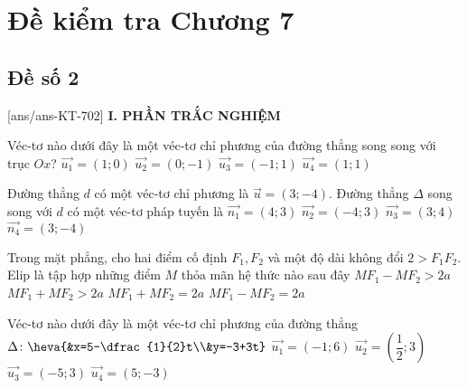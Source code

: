 \section*{Đề kiểm tra Chương 7}
\subsection*{Đề số 2}
\setcounter{ex}{0}\setcounter{bt}{0}
[ans/ans-KT-702]
\noindent\textbf{I. PHẦN TRẮC NGHIỆM}
	\begin{ex}%
	Véc-tơ nào dưới đây là một véc-tơ chỉ phương của đường thẳng song song với trục $Ox$?
	\choice
	{\True $\overrightarrow{u_{1}}=(1;0)$}
	{$\overrightarrow{u_{2}}=(0;-1)$}
	{$\overrightarrow{u_{3}}=(-1;1)$}
	{$\overrightarrow{u_{4}}=(1;1)$}
\end{ex}
	\begin{ex}%
	Đường thẳng $d$ có một véc-tơ chỉ phương là $\overrightarrow{u}=(3;-4)$. Đường thẳng $\Delta$ song song với $d$ có một véc-tơ pháp tuyến là
	\choice
	{\True $\overrightarrow{n_{1}}=(4;3)$}
	{$\overrightarrow{n_{2}}=(-4;3)$}
	{$\overrightarrow{n_{3}}=(3;4)$}
	{$\overrightarrow{n_{4}}=(3;-4)$}
\end{ex}	
	\begin{ex}%
		Trong mặt phẳng, cho hai điểm cố định $F_1, F_2$ và một độ dài không đổi $2>F_1F_2$. Elip là tập hợp những điểm $M$ thỏa mãn hệ thức nào sau đây
		\choice
		{$MF_1-MF_2>2a$}
		{$MF_1+MF_2>2a$}
		{\True $MF_1+MF_2=2a$}
		{$MF_1-MF_2=2a$}
	\end{ex}
\begin{ex}%
	Véc-tơ nào dưới đây là một véc-tơ chỉ phương của đường thẳng $\Delta \colon \heva{&x=5-\dfrac{1}{2}t\\&y=-3+3t}$
	\choice
	{\True $\overrightarrow{u_{1}}=(-1;6)$}
	{$\overrightarrow{u_{2}}=\left(\dfrac{1}{2};3\right)$}
	{$\overrightarrow{u_{3}}=(-5;3)$}
	{$\overrightarrow{u_{4}}=(5;-3)$}
\end{ex}
